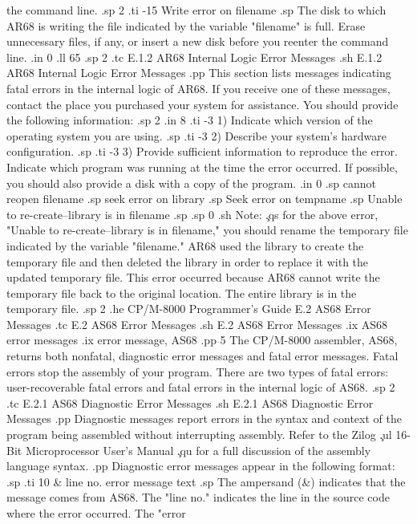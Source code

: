 the command line.
.sp 2
.ti -15
Write error on filename
.sp
The disk to which AR68 is writing the file indicated by the 
variable "filename" is full.  Erase unnecessary files, if any, or insert a 
new disk before you reenter the command line.
.in 0
.ll 65
.sp 2
.tc         E.1.2  AR68 Internal Logic Error Messages
.sh
E.1.2  AR68 Internal Logic Error Messages
.pp
This section lists messages indicating fatal errors in the internal logic of 
AR68.  If you receive one of these messages, contact the place 
you purchased your system for assistance.  
You should provide the following information:
.sp 2
.in 8
.ti -3
1) Indicate which version of the operating system you are using.
.sp
.ti -3
2) Describe your system's hardware configuration.
.sp
.ti -3
3) Provide sufficient information to reproduce the error.  Indicate 
which program was running at the time the error occurred.  If possible, 
you should also provide a disk with a copy of the program.
.in 0
.sp
cannot reopen  filename
.sp
seek error on library
.sp
Seek error on  tempname
.sp
Unable to re-create--library is in filename
.sp
.sp 0
.sh
Note:  \c
.qs
for the above error, "Unable to re-create--library is in 
filename," you should rename the temporary file indicated by the 
variable "filename."  AR68 used the library to create the 
temporary file and then deleted the library in order to replace 
it with the updated temporary file.  This error occurred 
because AR68 cannot write the temporary file back to the
original location.  The entire library is in the temporary file.
.sp 2
.he CP/M-8000 Programmer's Guide              E.2  AS68 Error Messages
.tc    E.2  AS68 Error Messages
.sh
E.2  AS68 Error Messages
.ix AS68 error messages
.ix error message, AS68
.pp 5
The CP/M-8000 assembler, AS68, returns both nonfatal, diagnostic error messages 
and fatal error messages. Fatal errors stop the assembly of your program.  
There are two types of fatal errors:  user-recoverable fatal errors and 
fatal errors in the internal logic of AS68.
.sp 2
.tc         E.2.1  AS68 Diagnostic Error Messages
.sh
E.2.1  AS68 Diagnostic Error Messages
.pp
Diagnostic messages report errors in the syntax and context of the program
being assembled without interrupting assembly.  Refer to the 
Zilog \c
.ul
16-Bit Microprocessor User's Manual \c
.qu
for a full discussion of the assembly language syntax.  
.pp
Diagnostic error messages 
appear in the following format:
.sp
.ti 10
& line no.  error message text
.sp
The ampersand (&) indicates that the message comes from AS68.  The "line no."
indicates the line in the source code where the error occurred.  The "error
